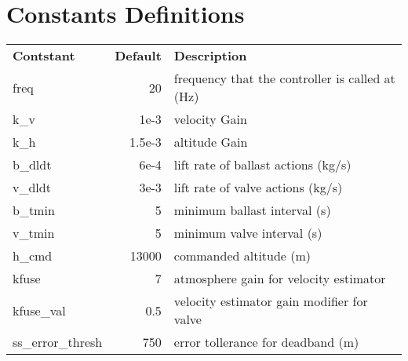 \documentclass[11pt]{article}
\begin{document}
\section{Constants Definitions}
\begin{table}[h!]
\rmfamily
\begin{tabular}{l r  l} 
\sffamily \textbf{Contstant} &\sffamily \textbf{Default} &\sffamily \textbf{Description} \\

{\ttfamily freq}              & 20 & frequency that the controller is called at (Hz) \\
{\ttfamily k\_v            }  & 1e-3  & velocity Gain \\
{\ttfamily k\_h            }  & 1.5e-3  & altitude Gain   \\
{\ttfamily b\_dldt         }  & 6e-4  & lift rate of ballast actions (kg/s) \\
{\ttfamily v\_dldt         }  & 3e-3  & lift rate of valve actions  (kg/s) \\
{\ttfamily b\_tmin         }  & 5  & minimum ballast interval (s)   \\
{\ttfamily v\_tmin         }  & 5  & minimum valve interval (s)\\
{\ttfamily h\_cmd          }  & 13000  & commanded altitude (m)   \\
{\ttfamily kfuse           }  & 7  & atmosphere gain for velocity estimator   \\
{\ttfamily kfuse\_val      }  & 0.5  & velocity estimator gain modifier for valve  \\
{\ttfamily ss\_error\_thresh} & 750  & error tollerance for deadband (m) \\
\end{tabular}
\end{table}
\end{document}
